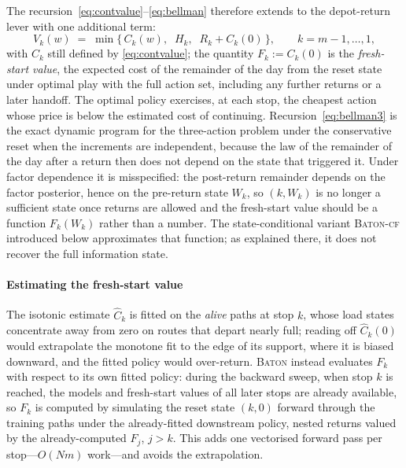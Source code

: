 \documentclass[preprint,authoryear,12pt]{elsarticle}
\theoremstyle{definition}
\theoremstyle{remark}
\begin{document}
The recursion~\eqref{eq:contvalue}--\eqref{eq:bellman} therefore
extends to the depot-return lever with one additional term:
\begin{equation}\label{eq:bellman3}
  V_k(w) \;=\; \min\bigl\{\, C_k(w),\;\; H_k,\;\;
      R_k + C_k(0) \,\bigr\},
  \qquad k = m-1, \dots, 1 ,
\end{equation}
with $C_k$ still defined by \eqref{eq:contvalue}; the quantity
$F_k := C_k(0)$ is the \emph{fresh-start value}, the expected cost of
the remainder of the day from the reset state under optimal play with
the full action set, including any further returns or a later handoff.
The optimal policy exercises, at each stop, the cheapest action whose
price is below the estimated cost of continuing.
Recursion~\eqref{eq:bellman3} is the exact dynamic program for the
three-action problem under the conservative reset when the increments
are independent, because the law of the remainder of the day after a
return then does not depend on the state that triggered it. Under
factor dependence it is misspecified: the post-return remainder depends
on the factor posterior, hence on the pre-return state $W_k$, so
$(k, W_k)$ is no longer a sufficient state once returns are allowed and
the fresh-start value should be a function $F_k(W_k)$ rather than a
number. The state-conditional variant \textsc{Baton-cf} introduced
below approximates that function; as explained there, it does not
recover the full information state.

\paragraph{Estimating the fresh-start value}\label{sec:cf} The isotonic estimate
$\widehat C_k$ is fitted on the \emph{alive} paths at stop $k$, whose
load states concentrate away from zero on routes that depart nearly
full; reading off $\widehat C_k(0)$ would extrapolate the monotone fit to
the edge of its support, where it is biased downward, and the fitted
policy would over-return. \textsc{Baton} instead evaluates $F_k$ with
respect to its own fitted policy: during the backward sweep, when stop
$k$ is reached, the models and fresh-start values of all later stops are
already available, so $F_k$ is computed by simulating the reset state
$(k,0)$ forward through the training paths under the already-fitted
downstream policy, nested returns valued by the already-computed $F_j$,
$j > k$. This adds one vectorised forward pass per stop---$O(Nm)$
work---and avoids the extrapolation.
\end{document}
